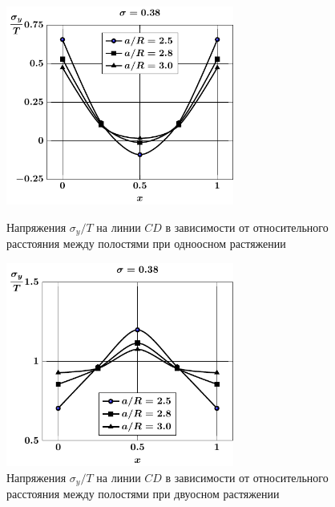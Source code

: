 \begin{figure}[h!]
\centering\footnotesize
\parbox[b]{7.5cm}{\centering\includegraphics[width=7.5cm]{spheres-cav13-a-t1-sig_y-cd.pdf}
\caption{Напряжения $\sigma_y/T$ на линии $CD$ в зависимости от относительного расстояния между полостями при одноосном растяжении
\label{f:8:46}}}\hfil\hfil
\parbox[b]{7.5cm}{\centering\includegraphics[width=7.5cm]{spheres-cav13-a-t2-sig_y-cd.pdf}
\caption{Напряжения $\sigma_y/T$ на линии $CD$ в зависимости от относительного расстояния между полостями при двуосном растяжении
\label{f:8:47}}}
\end{figure}

